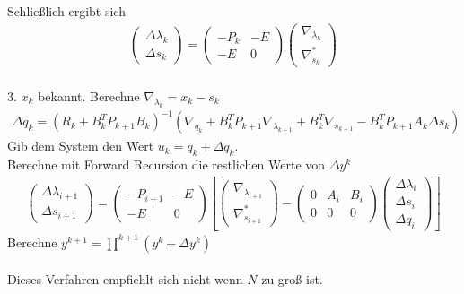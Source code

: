 \documentclass[12pt,a4paper]{article}
\begin{document}
  Schließlich ergibt sich
  \begin{align*}
  \begin{pmatrix}
  \Delta \lambda_{k} \\
  \Delta s_{k}
  \end{pmatrix} =
  \begin{pmatrix}
  -P_k & -E \\
  -E  & 0 
  \end{pmatrix}
  \begin{pmatrix}
  \nabla_{\lambda_{k}} \\
  \nabla_{s_{k}}^{*}
  \end{pmatrix}
  \end{align*} \\
  3. $x_k$ bekannt. Berechne $\nabla_{\lambda_{k}}=x_k -s_k $
  \begin{align*}
  \Delta q_{k} =
  (R_{k}+B_{k}^{T}P_{k+1} B_{k})^{-1}
  (\nabla_{q_{k}}+ B_{k}^{T}P_{k+1} \nabla_{\lambda_{k+1}} +
  B_{k}^{T}\nabla_{s_{k+1}} -B_{k}^{T}P_{k+1} A_{k} \Delta s_{k})  
  \end{align*}
  Gib dem System den Wert $u_k = q_k + \Delta q_k $.\\
  Berechne mit Forward Recursion die restlichen Werte von $\Delta y^{k}$
  \begin{align*}
  \begin{pmatrix}
  \Delta \lambda_{i+1} \\
  \Delta s_{i+1}
  \end{pmatrix} =
  \begin{pmatrix}
  -P_{i+1} & -E \\
  -E  & 0 
  \end{pmatrix}
  \left[ 
  \begin{pmatrix}
  \nabla_{\lambda_{i+1}} \\
  \nabla_{s_{i+1}}^{*}
  \end{pmatrix} -
  \begin{pmatrix}
  0 & A_i & B_i \\
  0 & 0 & 0 
  \end{pmatrix}
  \begin{pmatrix}
  \Delta \lambda_{i} \\
  \Delta s_{i} \\
  \Delta q_{i}
  \end{pmatrix} \right] 
  \end{align*}
  Berechne $ y^{k+1} = \prod ^{k+1}(y^{k} + \Delta y^{k})$ \\
  \\
  Dieses Verfahren empfiehlt sich nicht wenn $ N $ zu groß ist.\\
\end{document}
